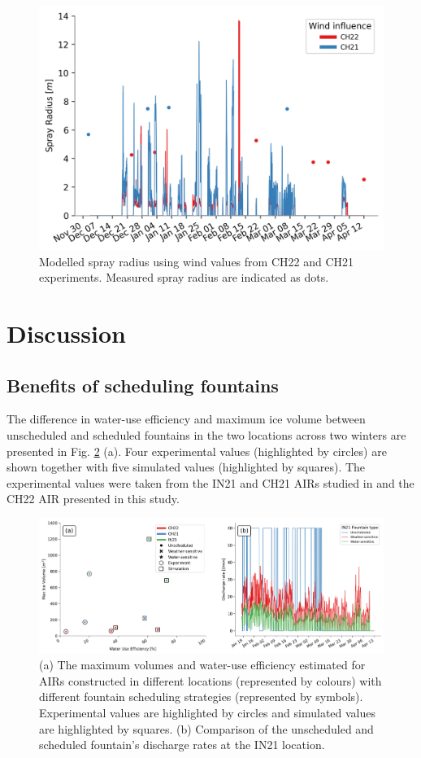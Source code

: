 \documentclass[tc, manuscript]{copernicus}
\begin{document}
\begin{figure}[t]
\includegraphics[width=12 cm]{Figures/radf.png}
\caption{Modelled spray radius using wind values from CH22 and CH21 experiments. Measured spray radius are
indicated as dots.}
\label{fig:wind}
\end{figure}

\section{Discussion}

\subsection{Benefits of scheduling fountains}

The difference in water-use efficiency and maximum ice volume between unscheduled and scheduled fountains in the two
locations across two winters are presented in Fig. \ref{fig:wue} (a). Four experimental values (highlighted by
circles) are shown together with five simulated values (highlighted by squares).  The experimental values were
taken from the IN21 and CH21 AIRs studied in \citet{balasubramanianInfluenceMeteorologicalConditions2022} and
the CH22 AIR presented in this study. 

\begin{figure}[t]
\includegraphics[width=\textwidth]{Figures/wue.png}

\caption{(a) The maximum volumes and water-use efficiency estimated for AIRs constructed in different locations
(represented by colours) with different fountain scheduling strategies (represented by symbols). Experimental
values are highlighted by circles and simulated values are highlighted by squares. (b) Comparison of
the unscheduled and scheduled fountain's discharge rates at the IN21 location.}

\label{fig:wue}
\end{figure}
\end{document}
